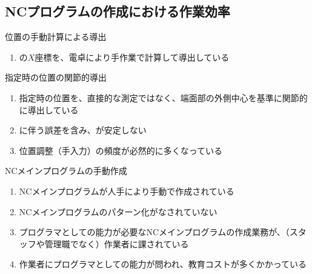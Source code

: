 \subsection{NCプログラムの作成における作業効率}

\begin{Issues}{\KeywayCenter 位置の手動計算による導出}
\begin{enumerate}[label=\sarrow]
\item[{\sarrow[red]}]\KeywayCenter の$X$座標を、電卓により手作業で計算して導出している
\end{enumerate}
\end{Issues}

\begin{Issues}{\AsideKeywayDepth 指定時の\KeywayCenter 位置の関節的導出}
\begin{enumerate}[label=\sarrow]
\item[{\sarrow[red]}]\AsideKeywayDepth 指定時の\KeywayCenter 位置を、直接的な測定ではなく、端面部の外側中心を基準に関節的に導出している
\item[{\sarrow[red]}]\CenterCurvature に伴う誤差を含み、\AsideKeywayDepth が安定しない
\item[{\sarrow[red]}]位置調整（手入力）の頻度が必然的に多くなっている
\end{enumerate}
\end{Issues}

\begin{Issues}{NCメインプログラムの手動作成}
\begin{enumerate}[label=\sarrow]
\item[{\sarrow[red]}]NCメインプログラムが人手により手動で作成されている
\item[{\sarrow[red]}]NCメインプログラムのパターン化がなされていない
\item[{\sarrow[red]}]プログラマとしての能力が必要なNCメインプログラムの作成業務が、（スタッフや管理職でなく）作業者に課されている
\item[{\sarrow[red]}]作業者にプログラマとしての能力が問われ、教育コストが多くかかっている
\end{enumerate}
\end{Issues}


